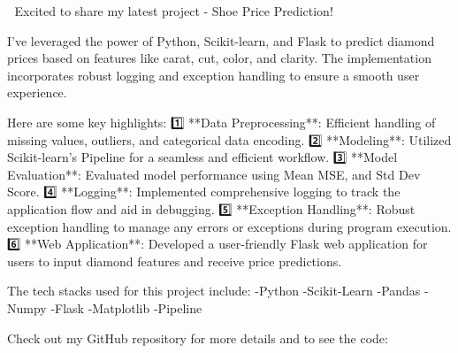 🔷 Excited to share my latest project - Shoe Price Prediction! 💎

I've leveraged the power of Python, Scikit-learn, and Flask to predict diamond prices based on features like carat, cut, color, and clarity. The implementation incorporates robust logging and exception handling to ensure a smooth user experience.

Here are some key highlights:
1️⃣ **Data Preprocessing**: Efficient handling of missing values, outliers, and categorical data encoding.
2️⃣ **Modeling**: Utilized Scikit-learn's Pipeline for a seamless and efficient workflow.
3️⃣ **Model Evaluation**: Evaluated model performance using Mean MSE, and Std Dev Score.
4️⃣ **Logging**: Implemented comprehensive logging to track the application flow and aid in debugging.
5️⃣ **Exception Handling**: Robust exception handling to manage any errors or exceptions during program execution.
6️⃣ **Web Application**: Developed a user-friendly Flask web application for users to input diamond features and receive price predictions.

The tech stacks used for this project include:
 -Python
 -Scikit-Learn
 -Pandas
 -Numpy
 -Flask
 -Matplotlib
 -Pipeline

Check out my GitHub repository for more details and to see the code:
